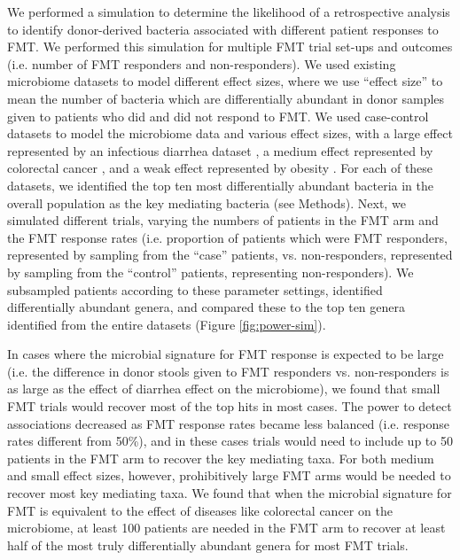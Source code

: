 We performed a simulation to determine the likelihood of a retrospective analysis to identify donor-derived bacteria associated with different patient responses to FMT.
We performed this simulation for multiple FMT trial set-ups and outcomes (i.e. number of FMT responders and non-responders).
We used existing microbiome datasets to model different effect sizes, where we use “effect size” to mean the number of bacteria which are differentially abundant in donor samples given to patients who did and did not respond to FMT.
We used case-control datasets to model the microbiome data and various effect sizes, with a large effect represented by an infectious diarrhea dataset \cite{Schubert2014}, a medium effect represented by colorectal cancer \cite{Baxter2016}, and a weak effect represented by obesity \cite{Goodrich2014}.
For each of these datasets, we identified the top ten most differentially abundant bacteria in the overall population as the key mediating bacteria (see Methods).
Next, we simulated different trials, varying the numbers of patients in the FMT arm and the FMT response rates (i.e. proportion of patients which were FMT responders, represented by sampling from the “case” patients, vs. non-responders, represented by sampling from the “control” patients, representing non-responders).
We subsampled patients according to these parameter settings, identified differentially abundant genera, and compared these to the top ten genera identified from the entire datasets (Figure \ref{fig:power-sim}).

In cases where the microbial signature for FMT response is expected to be large (i.e. the difference in donor stools given to FMT responders vs. non-responders is as large as the effect of diarrhea effect on the microbiome), we found that small FMT trials would recover most of the top hits in most cases.
The power to detect associations decreased as FMT response rates became less balanced (i.e. response rates different from 50\%), and in these cases trials would need to include up to 50 patients in the FMT arm to recover the key mediating taxa.
For both medium and small effect sizes, however, prohibitively large FMT arms would be needed to recover most key mediating taxa.
We found that when the microbial signature for FMT is equivalent to the effect of diseases like colorectal cancer on the microbiome, at least 100 patients are needed in the FMT arm to recover at least half of the most truly differentially abundant genera for most FMT trials.

